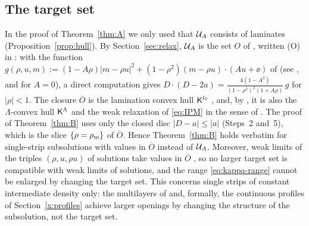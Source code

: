 \subsection{The target set}\label{x:target-set}
In the proof of Theorem~\ref{thm:A} we only used that $\mathcal{U}_A$ consists of laminates (Proposition~\ref{prop:hull}). By Section~\ref{sec:relax}, $\mathcal{U}_A$ is the set $O$ of \cite{Men22}, written (O)
in \cite{LM26}: with the function $g(\rho,u,m):=(1-A\rho)|m-\rho u|^2+(1-\rho^2)(m-\rho u)\cdot(Au+\ee)$ of \cite[(A.1)]{LM26} (see \cite[Lemmas~4.1--4.2]{Men22}, and \cite[Prop.~2.3]{Sze12} for
$A=0$), a direct computation gives $D\cdot(D-2a)=\frac{4(1-A^2)}{(1-\rho^2)^2(1+A\rho)}\,g$ for $|\rho|<1$. The closure $\overline O$ is the lamination convex hull $\mathsf{K}^{lc}$ \cite{Men22}, and, by
\cite[Thm.~2.4]{LM26}, it is also the $\Lambda$-convex hull $\mathsf{K}^\Lambda$ and the weak relaxation of \eqref{eq:IPM} in the sense of \cite[Sec.~2.1]{LM26}. The proof of Theorem~\ref{thm:B} uses only the
closed disc $|D-a|\le|a|$ (Steps~2 and~5), which is the slice $\{\rho=\rho_{\mathrm m}\}$ of $\overline O$. Hence Theorem~\ref{thm:B} holds verbatim for single-strip subsolutions with values in
$\overline O$ instead of $\mathcal{U}_A$. Moreover, weak limits of the triples $(\rho,u,\rho u)$ of solutions take values in $\overline O$ \cite[Lemma~A.4 and Thm.~2.4]{LM26}, so no larger target set is
compatible with weak limits of solutions, and the range \eqref{eq:kappa-range} cannot be enlarged by changing the target set. This concerns single strips of constant intermediate density only:
the multilayers of \cite[Sec.~7.5]{LM26} and, formally, the continuous profiles of Section~\ref{x:profiles} achieve larger openings by changing the structure of the subsolution, not the target set.

